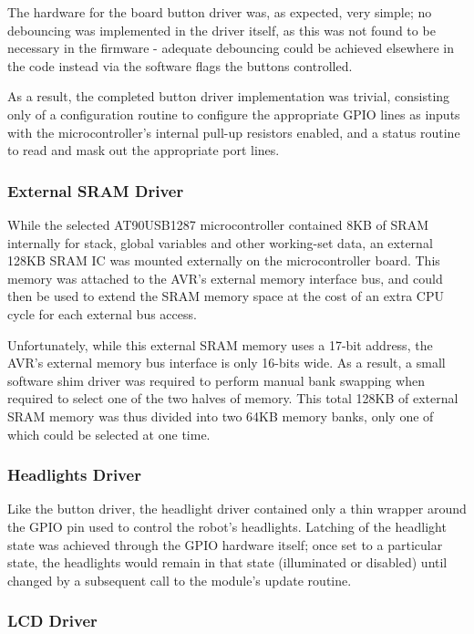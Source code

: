 The hardware for the board button driver was, as expected, very simple; no debouncing was implemented in the driver itself, as this was not found to be necessary in the firmware - adequate debouncing could be achieved elsewhere in the code instead via the software flags the buttons controlled.

As a result, the completed button driver implementation was trivial, consisting only of a configuration routine to configure the appropriate GPIO lines as inputs with the microcontroller's internal pull-up resistors enabled, and a status routine to read and mask out the appropriate port lines.

\FloatBarrier
\subsubsection{External SRAM Driver}

While the selected AT90USB1287 microcontroller contained 8KB of SRAM internally for stack, global variables and other working-set data, an external 128KB SRAM IC was mounted externally on the microcontroller board. This memory was attached to the AVR's external memory interface bus, and could then be used to extend the SRAM memory space at the cost of an extra CPU cycle for each external bus access.

Unfortunately, while this external SRAM memory uses a 17-bit address, the AVR's external memory bus interface is only 16-bits wide. As a result, a small software shim driver was required to perform manual bank swapping when required to select one of the two halves of memory. This total 128KB of external SRAM memory was thus divided into two 64KB memory banks, only one of which could be selected at one time.

\FloatBarrier
\subsubsection{Headlights Driver}

Like the button driver, the headlight driver contained only a thin wrapper around the GPIO pin used to control the robot's headlights. Latching of the headlight state was achieved through the GPIO hardware itself; once set to a particular state, the headlights would remain in that state (illuminated or disabled) until changed by a subsequent call to the module's update routine.

\FloatBarrier
\subsubsection{LCD Driver}

